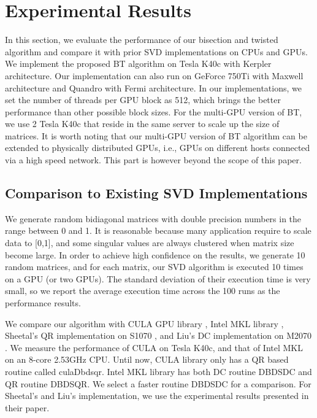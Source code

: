 \section{Experimental Results} \label{sec:results}
In this section, we evaluate the performance of our bisection and twisted algorithm and compare it with prior SVD implementations on CPUs and GPUs.
We implement the proposed BT algorithm on Tesla K40c with Kerpler architecture. 
Our implementation can also run on GeForce 750Ti with Maxwell architecture and Quandro with Fermi architecture.
In our implementations, we set the number of threads per GPU block as 512, which brings the better performance than other possible block sizes.
For the multi-GPU version of BT, we use 2 Tesla K40c that reside in the same server to scale up the size of matrices. 
It is worth noting that our multi-GPU version of BT algorithm can be extended to physically distributed GPUs, i.e., GPUs on different hosts connected via a high speed network. 
This part is however beyond the scope of this paper. 

\subsection{Comparison to Existing SVD Implementations}
We generate random bidiagonal matrices with double precision numbers in the range between 0 and 1.
It is reasonable because many application require to scale data to [0,1], and some singular values are always clustered when matrix size become large.
In order to achieve high confidence on the results, we generate 10 random matrices, and for each matrix, our SVD algorithm is executed 10 times on a GPU (or two GPUs).
The standard deviation of their execution time is very small, so we report the average execution time across the 100 runs as the performance results.

We compare our algorithm with CULA GPU library \cite{cula}, Intel MKL library \cite{mkl}, Sheetal's QR implementation on S1070 \cite{09IPDPSQR}, and Liu's DC implementation on M2070 \cite{13CFDC}.
We measure the performance of CULA on Tesla K40c, and that of Intel MKL on an 8-core 2.53GHz CPU.
Until now, CULA library only has a QR based routine called culaDbdsqr.
Intel MKL library has both DC routine DBDSDC and QR routine DBDSQR. We select a faster routine DBDSDC for a comparison.
For Sheetal's \cite{09IPDPSQR} and Liu's \cite{13CFDC} implementation, we use the experimental results presented in their paper. 

